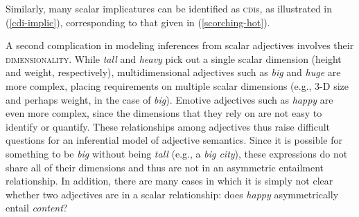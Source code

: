 \documentclass[10pt]{article}
\begin{document}
\vspace{-0.5em}
\vspace{-0.5em}

\noindent Similarly, many   scalar implicatures   can be identified as 
 \textsc{cdi}s, as illustrated in (\ref{cdi-implic}), corresponding to that given in (\ref{scorching-hot}). 

\vspace{-0.5em}
\vspace{-0.5em}



A second complication in modeling inferences from scalar adjectives involves their \textsc{dimensionality}. While \emph{tall} and \emph{heavy} pick out a single scalar dimension (height and weight, respectively), multidimensional adjectives such as \emph{big} and \emph{huge} are more complex, placing requirements on multiple scalar dimensions (e.g., 3-D size and perhaps weight, in the case of \emph{big}). Emotive adjectives such as \emph{happy} are even more complex, since the dimensions that they rely on are not easy to identify or quantify. These relationships among adjectives thus raise difficult questions for an inferential model of adjective semantics. Since it is possible for something to be \emph{big} without being \emph{tall} (e.g., a \emph{big city}), these expressions do not share all of their dimensions and thus are not in an asymmetric entailment relationship. In addition, there are many cases in which it is simply not clear whether two adjectives are in a scalar relationship: does \emph{happy} asymmetrically entail \emph{content}? 
\end{document}

